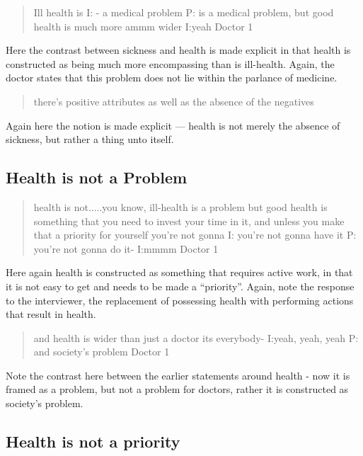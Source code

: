 \begin{quotation}
  
Ill health is 
I: - a medical problem 
P: is a medical problem, but good health is much more ammm wider
I:yeah 
Doctor 1
\end{quotation}

Here the contrast between sickness and health is made explicit in that health is constructed as being much more encompassing than is ill-health. Again, the doctor states that this problem does not lie within the parlance of medicine. 

\begin{quotation}
  there's positive attributes as well as the absence of the negatives

\end{quotation}
Again here the notion is made explicit --- health is not merely the absence of sickness, but rather a thing unto itself. 

\subsection{Health is not a Problem}
\label{sec:health-not-problem}

\begin{quotation}
  health is not.....you know, ill-health is a problem but good health is something that you need to invest your time in it, and unless you make that a priority for yourself you're not gonna
I: you're not gonna have it
P: you're not gonna do it-
I:mmmm
Doctor 1
\end{quotation}


Here again health is constructed as something that requires active work, in that it is not easy to get and needs to be made a ``priority''. Again, note the response to the interviewer, the replacement of possessing health with performing actions that result in health. 


\begin{quotation}
    and health is wider than just a doctor its everybody-
I:yeah, yeah, yeah
P: and society's problem 
Doctor 1
\end{quotation}

Note the contrast here between the earlier statements around health - now it is framed as a problem, but not a problem for doctors, rather it is constructed as society's problem. 


\subsection{Health is not a priority}
\label{sec:health-not-priority}

